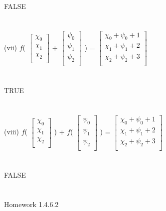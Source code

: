 \documentclass[11pt]{article}
\begin{document}
\\
\\
\\
FALSE
\\
\\
\\
(vii)
$f$(
$
\begin{bmatrix}
{\chi_{0}}\\
{\chi_{1}}\\
{\chi_{2}}\\
\end{bmatrix}$
+
$
\begin{bmatrix}
{\psi_{0}}\\
{\psi_{1}}\\
{\psi_{2}}\\
\end{bmatrix}$
)
=
$
\begin{bmatrix}
{\chi_{0} + \psi_{0} + 1}\\
{\chi_{1} + \psi_{1} + 2}\\
{\chi_{2} + \psi_{2} + 3}\\
\end{bmatrix}$
\\
\\
\\
TRUE
\\
\\
\\
(viii)
$f$(
$
\begin{bmatrix}
{\chi_{0}}\\
{\chi_{1}}\\
{\chi_{2}}\\
\end{bmatrix}$
)
+
$f$(
$
\begin{bmatrix}
{\psi_{0}}\\
{\psi_{1}}\\
{\psi_{2}}\\
\end{bmatrix}$
)
=
$
\begin{bmatrix}
{\chi_{0} + \psi_{0} + 1}\\
{\chi_{1} + \psi_{1} + 2}\\
{\chi_{2} + \psi_{2} + 3}\\
\end{bmatrix}$
\\
\\
\\
FALSE
\\
\\
\\
\newpage
Homework 1.4.6.2
\\
\end{document}
